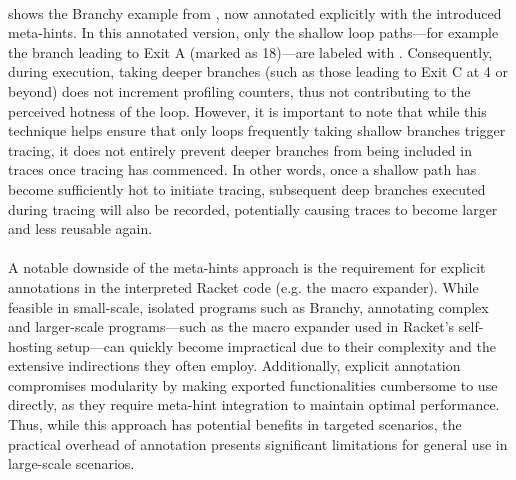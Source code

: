 
    \paragraph{}%
       shows the Branchy example from , now annotated explicitly with the introduced meta-hints. In this annotated version, only the shallow loop paths—for example the branch leading to Exit A (marked as \textcircled{\scriptsize{18}})—are labeled with . Consequently, during execution, taking deeper branches (such as those leading to Exit C at \textcircled{\scriptsize{4}} or beyond) does not increment profiling counters, thus not contributing to the perceived hotness of the loop. However, it is important to note that while this technique helps ensure that only loops frequently taking shallow branches trigger tracing, it does not entirely prevent deeper branches from being included in traces once tracing has commenced. In other words, once a shallow path has become sufficiently hot to initiate tracing, subsequent deep branches executed during tracing will also be recorded, potentially causing traces to become larger and less reusable again.

    \paragraph{}%
      A notable downside of the meta-hints approach is the requirement for explicit annotations in the interpreted Racket code (e.g. the macro expander). While feasible in small-scale, isolated programs such as Branchy, annotating complex and larger-scale programs—such as the macro expander used in Racket's self-hosting setup—can quickly become impractical due to their complexity and the extensive indirections they often employ. Additionally, explicit annotation compromises modularity by making exported functionalities cumbersome to use directly, as they require meta-hint integration to maintain optimal performance. Thus, while this approach has potential benefits in targeted scenarios, the practical overhead of annotation presents significant limitations for general use in large-scale scenarios.


